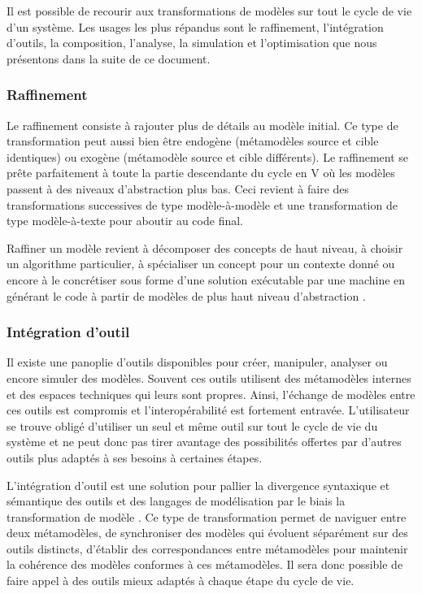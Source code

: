 Il est possible de recourir aux transformations de modèles sur tout le cycle de 
vie d'un système. Les usages les plus répandus sont le raffinement, 
l'intégration d'outils, la composition, l'analyse, la simulation et 
l'optimisation que nous présentons dans la suite de ce document. 


\subsubsection{Raffinement}

Le raffinement consiste à rajouter plus de détails au modèle initial. Ce type de 
transformation peut aussi bien être endogène (métamodèles source et cible 
identiques) ou exogène (métamodèle source et cible différents). Le raffinement se 
prête parfaitement à toute la partie descendante du cycle en V où les modèles 
passent à des niveaux d'abstraction plus bas. Ceci revient à faire des 
transformations successives de type modèle-à-modèle et une transformation de 
type modèle-à-texte pour aboutir au code final.

Raffiner un modèle revient à décomposer des concepts de haut niveau, à choisir 
un algorithme particulier, à spécialiser un concept pour un contexte donné ou 
encore à le concrétiser sous forme d'une solution exécutable par une machine en 
générant le code à partir de modèles de plus haut niveau d'abstraction 
\cite{czarnecki2000intentional}. 

\subsubsection{Intégration d'outil}

Il existe une panoplie d'outils disponibles pour créer, manipuler, analyser ou 
encore simuler des modèles. Souvent ces outils utilisent des métamodèles 
internes et des espaces techniques qui leurs sont propres. Ainsi, l'échange de 
modèles entre ces outils est compromis et l'interopérabilité est fortement 
entravée. L'utilisateur se trouve obligé d'utiliser un seul et même outil sur 
tout le cycle de vie du système et ne peut donc pas tirer avantage des 
possibilités offertes par d'autres outils plus adaptés à ses besoins à certaines 
étapes.

L'intégration d'outil est une solution pour pallier la divergence syntaxique et 
sémantique des outils et des langages de modélisation par le biais la 
transformation de modèle \cite{tratt2005model}. Ce type de transformation permet 
de naviguer entre deux métamodèles, de synchroniser des modèles qui évoluent 
séparément sur des outils distincts, d'établir des correspondances entre métamodèles pour 
maintenir la cohérence des modèles conformes à ces métamodèles. Il sera donc 
possible de faire appel à des outils mieux adaptés à chaque étape du cycle de 
vie.

